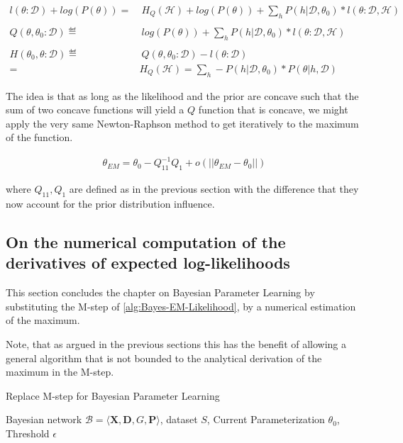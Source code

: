 \documentclass[11pt]{article}
\begin{document}
\begin{article}
\begin{align} \label{eq:likelihood_energy_map_iterative}
l (\theta: \mathscr{D}) + log(P(\theta)) =& \ H_Q (\mathscr {H}) + log(P(\theta)) + \sum_h P(h | \mathscr{D}, \theta_0) * l (\theta: \mathscr{D}, \mathscr{H})\\
\nonumber\\
Q(\theta, \theta_0 : \mathscr{D}) \eqdef& \ log(P(\theta)) + \sum_h P(h | \mathscr{D}, \theta_0) * l (\theta: \mathscr{D}, \mathscr{H})\\
\nonumber\\  
H(\theta_0, \theta: \mathscr{D}) \eqdef& \ Q(\theta, \theta_0 : \mathscr{D}) - l (\theta: \mathscr{D}) \\
                                 =& H_Q (\mathscr {H}) = \sum_h - P(h | \mathscr{D}, \theta_0) * P(\theta | h, \mathscr{D}) \nonumber
\end{align}

The idea is that as long as the likelihood and the prior are
concave such that the sum of two concave functions will yield a \(Q\)
function that is concave, we might apply the very same
Newton-Raphson method to get iteratively to the maximum of the
function.

\begin{align} 
 \theta_{EM}  = \theta_{0} - Q_{11}^{-1} Q_1 + o(||\theta_{EM} - \theta_{0}||) \label{eq:em-iterative}
\end{align}

where \(Q_{11}, Q_1\) are defined as in the previous section with the
difference that they now account for the prior distribution
influence.

\subsection{On the numerical computation of the derivatives of expected log-likelihoods}
\label{sec:orgd0c2ffa}

This section concludes the chapter on Bayesian Parameter Learning
by substituting the M-step of \ref{alg:Bayes-EM-Likelihood}, by a
numerical estimation of the maximum.

Note, that as argued in the previous sections this has the benefit
of allowing a general algorithm that is not bounded to the
analytical derivation of the maximum in the M-step.

\begin{algorithm*}[h!]
\caption{Replace M-step for Bayesian Parameter Learning}
\label{alg:Numerical-M-Step}
\vspace{-10pt}
\begin{multicols}{2}
\begin{algorithmic}[1] 
\Require Bayesian network $\mathcal{B}=\langle \mathbf{X},\mathbf{D}, G, \mathbf{P} \rangle$, dataset $S$, Current Parameterization $\theta_0$, Threshold $\epsilon$


\end{algorithmic}
\end{multicols}
\end{algorithm*}
\end{article}
\end{document}
